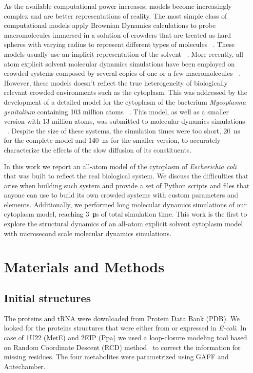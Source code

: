 \documentclass[journal=jacsat,manuscript=article]{achemso}
\begin{document}
As the available computational power increases, models become increasingly complex and are better representations of reality. The most simple class of computational models apply Brownian Dynamics calculations to probe macromolecules immersed in a solution of crowders that are treated as hard spheres with varying radius to represent different types of molecules ~\cite{ando2010crowding}. These models usually use an implicit representation of the solvent ~\cite{mcguffee2010diffusion}. More recently, all-atom explicit solvent molecular dynamics simulations have been employed on crowded systems composed by several copies of one or a few macromolecules ~\cite{wang2017influence}. However, these models doesn't reflect the true heterogeneity of biologically relevant crowded environments such as the cytoplasm. This was addressed by the development of a detailed model for the cytoplasm of the bacterium \textit{Mycoplasma genitalium} containing 103 million atoms ~\cite{feig2015complete}. This model, as well as a smaller version with 13 million atoms, was submitted to molecular dynamics simulations ~\cite{yu2016biomolecular}. Despite the size of these systems, the simulation times were too short, \SI{20}{\nano\second} for the complete model and \SI{140}{\nano\second} for the smaller version, to accurately characterize the effects of the slow diffusion of its constituents.

In this work we report an all-atom model of the cytoplasm of \textit{Escherichia coli} that was built to reflect the real biological system. We discuss the difficulties that arise when building such system and provide a set of Python scripts and files that anyone can use to build its own crowded systems with custom parameters and elements. Additionally, we performed long molecular dynamics simulations of our cytoplasm model, reaching \SI{3}{\micro\second} of total simulation time. This work is the first to explore the structural dynamics of an all-atom explicit solvent cytoplasm model with microsecond scale molecular dynamics simulations.



\section*{Materials and Methods}


\subsection*{Initial structures}
The proteins and tRNA were downloaded from Protein Data Bank (PDB). We looked for the proteins structures that were either from or expressed in {\em E-coli}. In case of 1U22 (MetE) and 2EIP (Ppa) we used a loop-closure modeling tool based on Random Coordinate Descent (RCD) method~\cite{Chys2013} to correct the information for missing residues. The four metabolites were parametrized using GAFF and Antechamber. 
\end{document}
